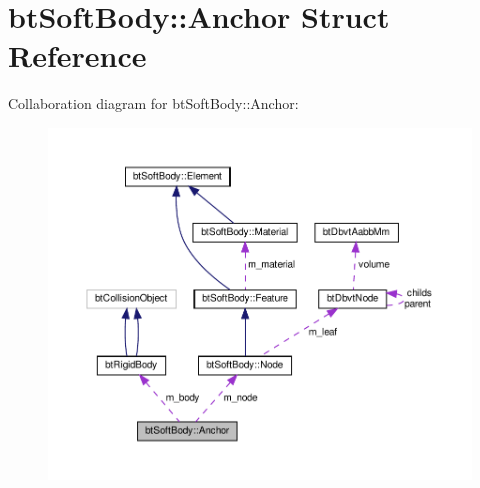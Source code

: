 \hypertarget{structbtSoftBody_1_1Anchor}{}\section{bt\+Soft\+Body\+:\+:Anchor Struct Reference}
\label{structbtSoftBody_1_1Anchor}


Collaboration diagram for bt\+Soft\+Body\+:\+:Anchor\+:
\nopagebreak
\begin{figure}[H]
\begin{center}
\leavevmode
\includegraphics[width=350pt]{structbtSoftBody_1_1Anchor__coll__graph}
\end{center}
\end{figure}
